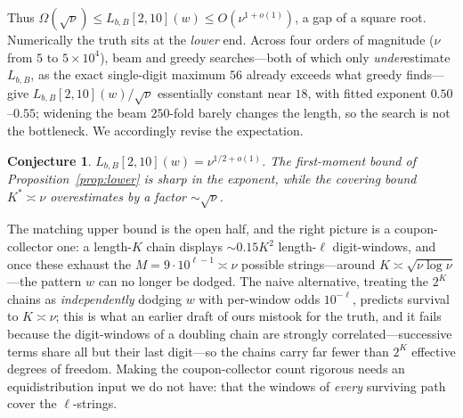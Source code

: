 \documentclass[11pt]{article}
\theoremstyle{plain}
\newtheorem{conjecture}{Conjecture}
\theoremstyle{definition}
\theoremstyle{remark}
\newcommand{\Lbb}{L_{b,B}}
\begin{document}
Thus $\Omega(\sqrt{\nu})\le\Lbb[2,10](w)\le O(\nu^{1+o(1)})$, a gap of a square root. Numerically the truth sits at the \emph{lower} end. Across four orders of magnitude ($\nu$ from $5$ to $5\times10^{4}$), beam and greedy searches---both of which only \emph{under}estimate $\Lbb$, as the exact single-digit maximum $56$ already exceeds what greedy finds---give $\Lbb[2,10](w)/\sqrt\nu$ essentially constant near $18$, with fitted exponent $0.50$--$0.55$; widening the beam $250$-fold barely changes the length, so the search is not the bottleneck. We accordingly revise the expectation.

\begin{conjecture}\label{conj:sqrt}
$\Lbb[2,10](w)=\nu^{1/2+o(1)}$. The first-moment bound of Proposition~\ref{prop:lower} is sharp in the exponent, while the covering bound $K^{*}\asymp\nu$ overestimates by a factor $\sim\sqrt\nu$.
\end{conjecture}

The matching upper bound is the open half, and the right picture is a coupon-collector one: a length-$K$ chain displays $\sim0.15K^{2}$ length-$\ell$ digit-windows, and once these exhaust the $M=9\cdot10^{\ell-1}\asymp\nu$ possible strings---around $K\asymp\sqrt{\nu\log\nu}$---the pattern $w$ can no longer be dodged. The naive alternative, treating the $2^{K}$ chains as \emph{independently} dodging $w$ with per-window odds $10^{-\ell}$, predicts survival to $K\asymp\nu$; this is what an earlier draft of ours mistook for the truth, and it fails because the digit-windows of a doubling chain are strongly correlated---successive terms share all but their last digit---so the chains carry far fewer than $2^{K}$ effective degrees of freedom. Making the coupon-collector count rigorous needs an equidistribution input we do not have: that the windows of \emph{every} surviving path cover the $\ell$-strings.
\end{document}
